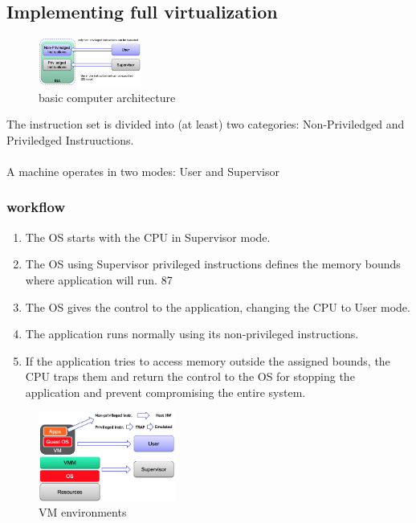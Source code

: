 \documentclass[10pt, oneside]{article}
\begin{document}
\subsection{Implementing full virtualization}
\begin{multicols}{2}
    \begin{figure}[H]
        \begin{center}
        \includegraphics[width=0.3\textwidth]{img/img46.png}
        \caption{basic computer architecture}
        \label{fig:basic computer architecture}
        \end{center}
    \end{figure}
    \columnbreak
    The instruction set is divided into (at least) two categories: Non-Priviledged and Priviledged Instruuctions.\\\\A machine operates in two modes: User and Supervisor
\end{multicols}

\subsubsection{workflow}
\begin{multicols}{2}
    \begin{enumerate}
        \item The OS starts with the CPU in Supervisor mode.
        \item The OS using Supervisor privileged instructions defines the memory bounds where application will run.
        87
        \item The OS gives the control to the application, changing the CPU to User mode.
        \item The application runs normally using its non-privileged instructions.
        \item If the application tries to access memory outside the assigned bounds, the CPU traps them and return the control to the OS for stopping the application and prevent compromising the entire system.
    \end{enumerate}
    \columnbreak
    \begin{figure}[H]
        \begin{center}
        \includegraphics[width=0.4\textwidth]{img/img47.png}
        \caption{VM environments}
        \label{fig:VM environments}
        \end{center}
    \end{figure}
\end{multicols}
\newpage
\end{document}
